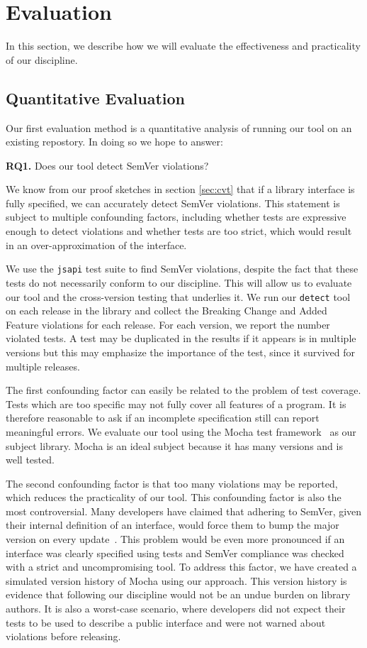 \section{Evaluation}
In this section, we describe how we will evaluate the effectiveness
and practicality of our discipline.

\subsection{Quantitative Evaluation}
Our first evaluation method is a quantitative analysis of running our
tool on an existing repostory. In doing so we hope to answer:

{\bf RQ1.} Does our tool detect SemVer violations?

We know from our proof sketches in section \ref{sec:cvt} that if a
library interface is fully specified, we can accurately detect SemVer
violations. This statement is subject to multiple confounding
factors, including whether tests are expressive enough to detect
violations and whether tests are too strict, which would result in an
over-approximation of the interface.

We use the {\tt jsapi} test suite to find SemVer violations, despite
the fact that these tests do not necessarily conform to our
discipline. 
%
This will allow us to evaluate our tool and the cross-version testing
that underlies it.
%
We run our {\tt detect} tool on each release in the library and
collect the Breaking Change and Added Feature violations for each
release. For each version, we report the number violated tests. A test
may be duplicated in the results if it appears is in multiple versions
but this may emphasize the importance of the test, since it survived
for multiple releases.

The first confounding factor can easily be related to the problem of
test coverage. Tests which are too specific may not fully cover all
features of a program. It is therefore reasonable to ask if an
incomplete specification still can report meaningful errors.  We
evaluate our tool using the Mocha test framework~\cite{mocha} as our
subject library. Mocha is an ideal subject because it has many
versions and is well tested.

The second confounding factor is that too many violations may be
reported, which reduces the practicality of our tool. This
confounding factor is also the most controversial. Many developers
have claimed that adhering to SemVer, given their internal definition
of an interface, would force them to bump the major version on every
update~\cite{backbone-2888,exoplayer-1382,crawford-not-semver}. This
problem would be even more pronounced if an interface was clearly
specified using tests and SemVer compliance was checked with a strict
and uncompromising tool. To address this factor, we have created a
simulated version history of Mocha using our approach. This version
history is evidence that following our discipline would not be an undue
burden on library authors. It is also a worst-case scenario, where
developers did not expect their tests to be used to describe a public
interface and were not warned about violations before releasing.

